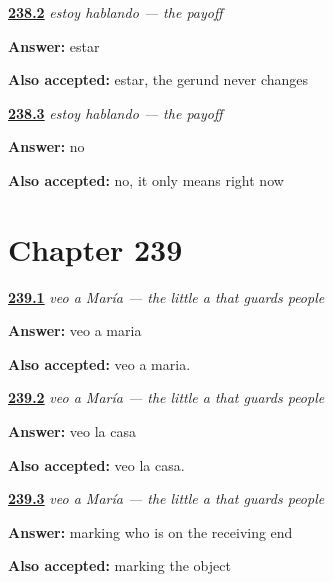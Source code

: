 \noindent\begin{minipage}[t]{\linewidth}
\raggedright
\hyperlink{review-ES-C62-estoy-hablando-which}{\textbf{238.2}} \emph{estoy hablando — the payoff}\par
\small \textbf{Answer:} estar\par
\footnotesize \textbf{Also accepted:} estar, the gerund never changes
\end{minipage}\par\medskip

\noindent\begin{minipage}[t]{\linewidth}
\raggedright
\hyperlink{review-ES-C62-estoy-hablando-future}{\textbf{238.3}} \emph{estoy hablando — the payoff}\par
\small \textbf{Answer:} no\par
\footnotesize \textbf{Also accepted:} no, it only means right now
\end{minipage}\par\medskip

\section*{Chapter 239}

\noindent\begin{minipage}[t]{\linewidth}
\raggedright
\hyperlink{review-ES-C62-veo-a-maria-person}{\textbf{239.1}} \emph{veo a María — the little a that guards people}\par
\small \textbf{Answer:} veo a maria\par
\footnotesize \textbf{Also accepted:} veo a maria.
\end{minipage}\par\medskip

\noindent\begin{minipage}[t]{\linewidth}
\raggedright
\hyperlink{review-ES-C62-veo-a-maria-thing}{\textbf{239.2}} \emph{veo a María — the little a that guards people}\par
\small \textbf{Answer:} veo la casa\par
\footnotesize \textbf{Also accepted:} veo la casa.
\end{minipage}\par\medskip

\noindent\begin{minipage}[t]{\linewidth}
\raggedright
\hyperlink{review-ES-C62-veo-a-maria-why}{\textbf{239.3}} \emph{veo a María — the little a that guards people}\par
\small \textbf{Answer:} marking who is on the receiving end\par
\footnotesize \textbf{Also accepted:} marking the object
\end{minipage}\par\medskip

